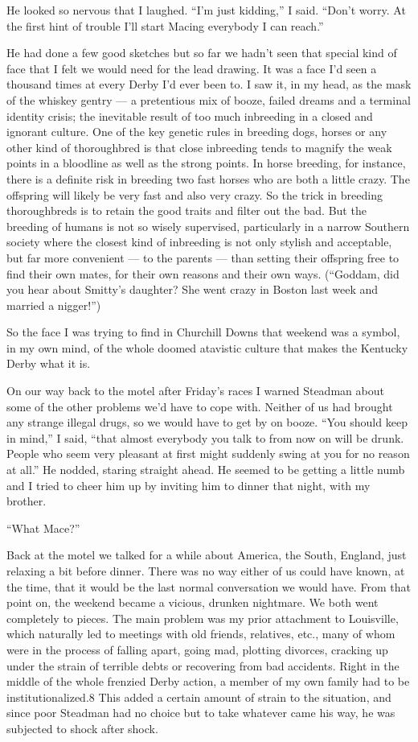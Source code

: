 \documentclass[10pt,a4paper]{article}
\begin{document}
He looked so nervous that I laughed. “I’m just kidding,” I said. “Don’t worry. At the first hint of trouble I’ll start Macing everybody I can reach.”

He had done a few good sketches but so far we hadn’t seen that special kind of face that I felt we would need for the lead drawing. It was a face I’d seen a thousand times at every Derby I’d ever been to. I saw it, in my head, as the mask of the whiskey gentry — a pretentious mix of booze, failed dreams and a terminal identity crisis; the inevitable result of too much inbreeding in a closed and ignorant culture. One of the key genetic rules in breeding dogs, horses or any other kind of thoroughbred is that close inbreeding tends to magnify the weak points in a bloodline as well as the strong points. In horse breeding, for instance, there is a definite risk in breeding two fast horses who are both a little crazy. The offspring will likely be very fast and also very crazy. So the trick in breeding thoroughbreds is to retain the good traits and filter out the bad. But the breeding of humans is not so wisely supervised, particularly in a narrow Southern society where the closest kind of inbreeding is not only stylish and acceptable, but far more convenient — to the parents — than setting their offspring free to find their own mates, for their own reasons and their own ways. (“Goddam, did you hear about Smitty’s daughter? She went crazy in Boston last week and married a nigger!”)

So the face I was trying to find in Churchill Downs that weekend was a symbol, in my own mind, of the whole doomed atavistic culture that makes the Kentucky Derby what it is.

On our way back to the motel after Friday’s races I warned Steadman about some of the other problems we’d have to cope with. Neither of us had brought any strange illegal drugs, so we would have to get by on booze. “You should keep in mind,” I said, “that almost everybody you talk to from now on will be drunk. People who seem very pleasant at first might suddenly swing at you for no reason at all.” He nodded, staring straight ahead. He seemed to be getting a little numb and I tried to cheer him up by inviting him to dinner that night, with my brother.

“What Mace?”

Back at the motel we talked for a while about America, the South, England, just relaxing a bit before dinner. There was no way either of us could have known, at the time, that it would be the last normal conversation we would have. From that point on, the weekend became a vicious, drunken nightmare. We both went completely to pieces. The main problem was my prior attachment to Louisville, which naturally led to meetings with old friends, relatives, etc., many of whom were in the process of falling apart, going mad, plotting divorces, cracking up under the strain of terrible debts or recovering from bad accidents. Right in the middle of the whole frenzied Derby action, a member of my own family had to be institutionalized.8 This added a certain amount of strain to the situation, and since poor Steadman had no choice but to take whatever came his way, he was subjected to shock after shock.
\end{document}
